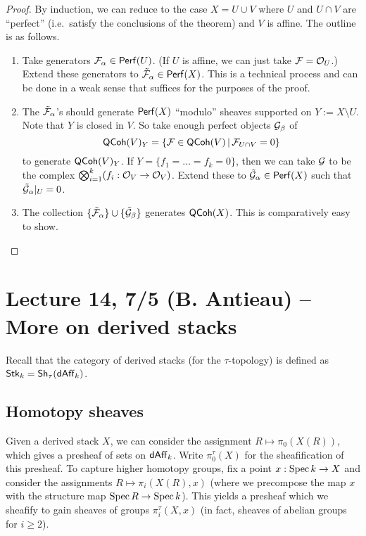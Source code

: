 \documentclass{amsart}
\begin{document}
\begin{proof}
	By induction, we can reduce to the case $X = U \cup V$ where $U$ and $U \cap V$ are ``perfect'' (i.e.\ satisfy the conclusions of the theorem) and $V$ is affine.
	The outline is as follows.
	\begin{enumerate}
		\item Take generators $\mathcal{F}_\alpha \in \mathsf{Perf}(U)$.
			(If $U$ is affine, we can just take $\mathcal{F} = \mathcal{O}_U$.)
			Extend these generators to $\tilde{\mathcal{F}}_\alpha \in \mathsf{Perf}(X)$.
			This is a technical process and can be done in a weak sense that suffices for the purposes of the proof.
		\item The $\tilde{\mathcal{F}}_\alpha$'s should generate $\mathsf{Perf}(X)$ ``modulo'' sheaves supported on $Y := X \setminus U$.
			Note that $Y$ is closed in $V$.
			So take enough perfect objects $\mathcal{G}_\beta$ of 
			\[
				\mathsf{QCoh}(V)_Y = \{ \mathcal{F} \in \mathsf{QCoh}(V) \, | \, \mathcal{F}_{U \cap V} = 0 \}
			\]
			to generate $\mathsf{QCoh}(V)_Y$.
			If $Y = \{ f_1 = \dots = f_k = 0 \}$, then we can take $\mathcal{G}$ to be the complex $\bigotimes_{i=1}^k (f_i: \mathcal{O}_V \to \mathcal{O}_V)$.
			Extend these to $\tilde{\mathcal{G}}_\alpha \in \mathsf{Perf}(X)$ such that $\tilde{\mathcal{G}}_\alpha|_U = 0$.
		\item The collection $\{\tilde{\mathcal{F}}_\alpha\} \cup \{\tilde{\mathcal{G}}_\beta\}$ generates $\mathsf{QCoh}(X)$.
			This is comparatively easy to show. \qedhere
	\end{enumerate}
\end{proof}

\section{Lecture 14, 7/5 (B. Antieau) -- More on derived stacks}

Recall that the category of derived stacks (for the $\tau$-topology) is defined as $\mathsf{Stk}_k = \mathsf{Sh}_\tau(\mathsf{dAff}_k)$.

\subsection{Homotopy sheaves}

Given a derived stack $X$, we can consider the assignment $R \mapsto \pi_0(X(R))$, which gives a presheaf of sets on $\mathsf{dAff}_k$.
Write $\pi_0^\tau(X)$ for the sheafification of this presheaf.
To capture higher homotopy groups, fix a point $x: \operatorname{Spec} k \to X$ and consider the assignments $R \mapsto \pi_i(X(R), x)$ (where we precompose the map $x$ with the structure map $\operatorname{Spec} R \to \operatorname{Spec} k$).
This yields a presheaf which we sheafify to gain sheaves of groups $\pi_i^\tau(X, x)$ (in fact, sheaves of abelian groups for $i \geq 2$).
\end{document}
